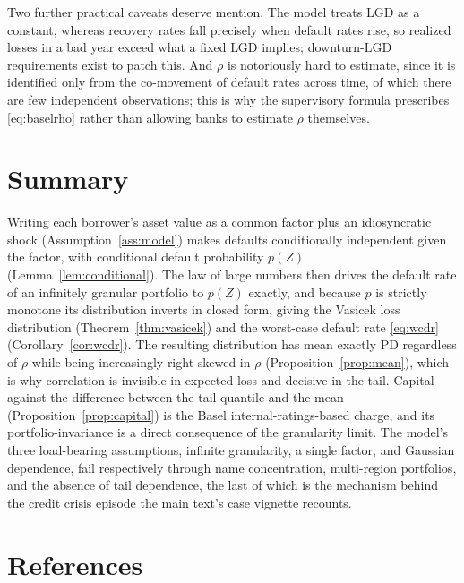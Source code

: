 \documentclass[11pt]{article}
\theoremstyle{remark}
\theoremstyle{definition}
\begin{document}
Two further practical caveats deserve mention. The model treats $\text{LGD}$ as a constant, whereas recovery rates fall precisely when default rates rise, so realized losses in a bad year exceed what a fixed $\text{LGD}$ implies; downturn-$\text{LGD}$ requirements exist to patch this. And $\rho$ is notoriously hard to estimate, since it is identified only from the co-movement of default rates across time, of which there are few independent observations; this is why the supervisory formula prescribes \eqref{eq:baselrho} rather than allowing banks to estimate $\rho$ themselves.

\section{Summary}
\label{sec:summary}

Writing each borrower's asset value as a common factor plus an idiosyncratic shock (Assumption~\ref{ass:model}) makes defaults conditionally independent given the factor, with conditional default probability $p(Z)$ (Lemma~\ref{lem:conditional}). The law of large numbers then drives the default rate of an infinitely granular portfolio to $p(Z)$ exactly, and because $p$ is strictly monotone its distribution inverts in closed form, giving the Vasicek loss distribution (Theorem~\ref{thm:vasicek}) and the worst-case default rate \eqref{eq:wcdr} (Corollary~\ref{cor:wcdr}). The resulting distribution has mean exactly $\text{PD}$ regardless of $\rho$ while being increasingly right-skewed in $\rho$ (Proposition~\ref{prop:mean}), which is why correlation is invisible in expected loss and decisive in the tail. Capital against the difference between the tail quantile and the mean (Proposition~\ref{prop:capital}) is the Basel internal-ratings-based charge, and its portfolio-invariance is a direct consequence of the granularity limit. The model's three load-bearing assumptions, infinite granularity, a single factor, and Gaussian dependence, fail respectively through name concentration, multi-region portfolios, and the absence of tail dependence, the last of which is the mechanism behind the credit crisis episode the main text's case vignette recounts.

\section*{References}
\end{document}
